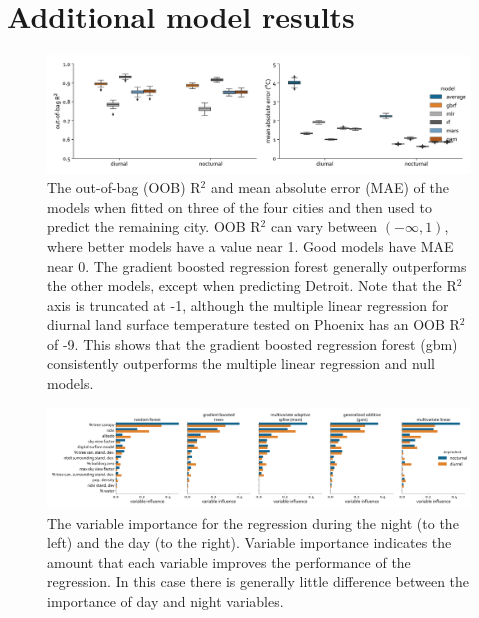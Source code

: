 \documentclass[final,3p,times,twocolumn,sort&compress]{elsarticle}
\begin{document}
\section{Additional model results}
\begin{figure}
    \centering
    \includegraphics[width=\linewidth]{fig/report/holdout_results_100.pdf}
    \caption{
    The out-of-bag (OOB) R$^2$ and mean absolute error (MAE) of the models when fitted on three of the four cities and then used to predict the remaining city. OOB R$^2$ can vary between $(-\infty, 1)$, where better models have a value near 1. Good models have MAE near 0. The gradient boosted regression forest generally outperforms the other models, except when predicting Detroit. Note that the R$^2$ axis is truncated at -1, although the multiple linear regression for diurnal land surface temperature tested on Phoenix has an OOB R$^2$ of -9.  This shows that the gradient boosted regression forest (gbm) consistently outperforms the multiple linear regression and null models.
    }
    \label{fig:holdout_results}
\end{figure}



\begin{figure}
\begin{center}
\includegraphics[width=\textwidth]{fig/report/variableImportance_100.pdf}
\caption{The variable importance for the regression during the night (to the left) and the day (to the right). Variable importance indicates the amount that each variable improves the performance of the regression.
In this case there is generally little difference between the importance of day and night variables.}
\label{fig:importance}
\end{center}
\end{figure}
\end{document}
